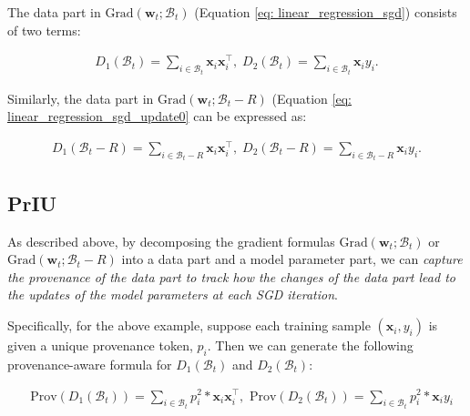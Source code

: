 \documentclass[11pt]{article}
\newcommand{\priu}{PrIU}
\newcommand{\w}{\textbf{w}}
\newcommand{\x}{\textbf{x}}
\newcommand{\y}{y}
\newcommand{\miniB}{\mathscr{B}}
\begin{document}
The data part in $\text{Grad}(\w_t; \miniB_t)$ (Equation \eqref{eq: linear_regression_sgd}) consists of two terms:
\begin{small}
\begin{align*}
D_1(\miniB_t) = \sum\nolimits_{i \in \miniB_t} \x_i\x_i^\top, \; D_2(\miniB_t) = \sum\nolimits_{i \in \miniB_t}\x_i \y_i.    
\end{align*}
\end{small}

Similarly, the data part in $\text{Grad}(\w_t; \miniB_t-R)$ (Equation \eqref{eq: linear_regression_sgd_update0} can be expressed as: 
\begin{small}
\begin{align*}
D_1(\miniB_t - R) = \sum\nolimits_{i \in \miniB_t - R} \x_i\x_i^\top, \; D_2(\miniB_t - R) = \sum\nolimits_{i \in \miniB_t-R}\x_i \y_i.    
\end{align*}
\end{small}


\subsection{\priu}
As described above, by decomposing the gradient formulas $\text{Grad}(\w_t; \miniB_t)$ or $\text{Grad}(\w_t; \miniB_t - R)$ into a data part and a model parameter part, we can \emph{capture the provenance of the data part to track how the changes of the data part lead to the updates of the model parameters at each SGD iteration}. 

Specifically, for the above example, suppose each training sample $(\x_i, \y_i)$ is given a unique provenance token, $p_i$.  Then we can generate the following provenance-aware formula for $D_1(\miniB_t)$ and $D_2(\miniB_t)$:
\begin{small}
\begin{align*}
    &\text{Prov}(D_1(\miniB_t)) = \sum\nolimits_{i \in \miniB_t} p_i^2*\x_i\x_i^\top, \text{ Prov}(D_2(\miniB_t)) =  \sum\nolimits_{i \in \miniB_t}p_i^2*\x_i \y_i
\end{align*}
\end{small}
\end{document}
